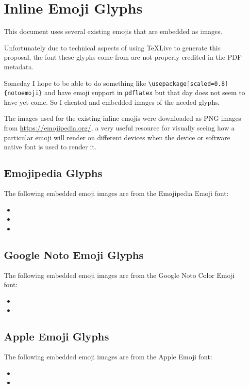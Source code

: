 \section{Inline Emoji Glyphs}

This document uses several existing emojis that are embedded as images.

Unfortunately due to technical aspects of using \TeX{}Live to generate this proposal, the font
these glyphs come from are not properly credited in the PDF metadata.

Someday I hope to be able to do something like
\texttt{\textbackslash{}usepackage[scaled=0.8]\{notoemoji\}}
and have emoji support in \texttt{pdflatex} but that day does not seem
to have yet come. So I cheated and embedded images of the needed glyphs.

The images used for the existing inline emojis were downloaded as
PNG images from \url{https://emojipedia.org/}, a very useful resource
for visually seeing how a particular emoji will render on different
devices when the device or software native font is used to render it.

\subsection*{Emojipedia Glyphs}

The following embedded emoji images are from the Emojipedia Emoji font:

\begin{itemize}
\item \brainemoji{}
\item \infinityemoji{}
\item \jigsawemoji{}
\end{itemize}

\subsection*{Google Noto Emoji Glyphs}

The following embedded emoji images are from the Google\textsuperscript{\textregistered} Noto Color Emoji font:

\begin{itemize}
\item \rainbow{}
\item \prideflag{}
\end{itemize}

\subsection*{Apple Emoji Glyphs}

The following embedded emoji images are from the Apple\textsuperscript{\textregistered} Emoji font:

\begin{itemize}
\item \nerdface{}
\item \goldheart{}
\end{itemize}
